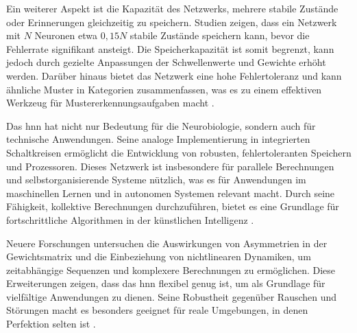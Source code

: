 Ein weiterer Aspekt ist die Kapazität des Netzwerks, mehrere stabile Zustände oder Erinnerungen gleichzeitig zu speichern. Studien zeigen, dass ein Netzwerk mit \(N\) Neuronen etwa \(0,15N\) stabile Zustände speichern kann, bevor die Fehlerrate signifikant ansteigt. Die Speicherkapazität ist somit begrenzt, kann jedoch durch gezielte Anpassungen der Schwellenwerte und Gewichte erhöht werden. Darüber hinaus bietet das Netzwerk eine hohe Fehlertoleranz und kann ähnliche Muster in Kategorien zusammenfassen, was es zu einem effektiven Werkzeug für Mustererkennungsaufgaben macht \cite[vgl. S. 2556]{Hopfield1982} \cite[vgl. S. 3091]{Hopfield1984}.

Das \ac{hnn} hat nicht nur Bedeutung für die Neurobiologie, sondern auch für technische Anwendungen. Seine analoge Implementierung in integrierten Schaltkreisen ermöglicht die Entwicklung von robusten, fehlertoleranten Speichern und Prozessoren. Dieses Netzwerk ist insbesondere für parallele Berechnungen und selbstorganisierende Systeme nützlich, was es für Anwendungen im maschinellen Lernen und in autonomen Systemen relevant macht. Durch seine Fähigkeit, kollektive Berechnungen durchzuführen, bietet es eine Grundlage für fortschrittliche Algorithmen in der künstlichen Intelligenz \cite[vgl. S. 2554 ff.]{Hopfield1982}.

Neuere Forschungen untersuchen die Auswirkungen von Asymmetrien in der Gewichtsmatrix und die Einbeziehung von nichtlinearen Dynamiken, um zeitabhängige Sequenzen und komplexere Berechnungen zu ermöglichen. Diese Erweiterungen zeigen, dass das \ac{hnn} flexibel genug ist, um als Grundlage für vielfältige Anwendungen zu dienen. Seine Robustheit gegenüber Rauschen und Störungen macht es besonders geeignet für reale Umgebungen, in denen Perfektion selten ist \cite[vgl. S. 2557]{Hopfield1982} \cite[vgl. S. 3092]{Hopfield1984}.
